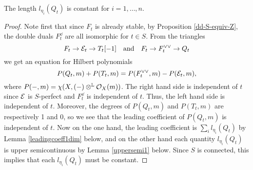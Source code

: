 \begin{prop}\label{lengthconstant}
The length $l_{\eta_i}(Q_t)$ is constant for $i = 1, \ldots, n$. 
\end{prop}
\begin{proof}
Note first that since $F_t$ is already stable, by Proposition \ref{dd-S-equiv-Z}, the double duals $F_t^\dd$ are all isomorphic for $t \in S$. From the triangles
\[ F_t \to \mathcal{E}_t \to T_t[-1] \quad \text{and} \quad F_t \to F_t^{\vee\vee} \to Q_t \]
we get an equation for Hilbert polynomials
\[ P(Q_t, m) + P(T_t, m) = P(F_t^{\vee\vee}, m) - P(\mathcal{E}_t, m), \]
where $P(-,m) = \chi(X, (-) \otimes^{\mathbb{L}} \mathcal{O}_X(m))$. The right hand side is independent of $t$ since $\mathcal{E}$ is $S$-perfect and $F_t^\dd$ is independent of $t$. Thus, the left hand side is independent of $t$. Moreover, the degrees of $P(Q_t, m)$ and $P(T_t, m)$ are respectively 1 and 0, so we see that the leading coefficient of $P(Q_t, m)$ is independent of $t$. Now on the one hand, the leading coefficient is $\sum_i l_{\eta_i}(Q_t)$ by Lemma \ref{leadingcoeff1dim} below, and on the other hand each quantity $l_{\eta_i}(Q_t)$ is upper semicontinuous by Lemma \ref{uppersemi1} below. Since $S$ is connected, this implies that each $l_{\eta_i}(Q_t)$ must be constant.
\end{proof}

